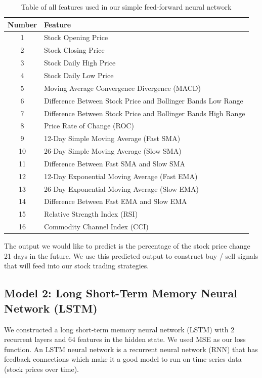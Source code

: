 \documentclass[10pt]{article}
\begin{document}
\begin{table}[H]
\centering
\begin{tabular}{| c | l |} 
\hline
Number & Feature \\
\hline
1 & Stock Opening Price \\
2 & Stock Closing Price \\
3 & Stock Daily High Price \\
4 & Stock Daily Low Price \\
5 & Moving Average Convergence Divergence (MACD) \\
6 & Difference Between Stock Price and Bollinger Bands Low Range \\
7 & Difference Between Stock Price and Bollinger Bands High Range  \\
8 & Price Rate of Change (ROC) \\
9 & 12-Day Simple Moving Average (Fast SMA) \\
10 & 26-Day Simple Moving Average (Slow SMA) \\
11 & Difference Between Fast SMA and Slow SMA \\
12 & 12-Day Exponential Moving Average (Fast EMA) \\
13 & 26-Day Exponential Moving Average (Slow EMA) \\
14 & Difference Between Fast EMA and Slow EMA \\
15 & Relative Strength Index (RSI) \\
16 & Commodity Channel Index (CCI) \\
\hline
\end{tabular}
\caption{Table of all features used in our simple feed-forward neural network}
\label{fffeatures}
\end{table}

The output we would like to predict is the percentage of the stock price change 21 days in the future. We use this predicted output to construct buy / sell signals that will feed into our stock trading strategies.



\subsection{Model 2: Long Short-Term Memory Neural Network (LSTM)}

We constructed a long short-term memory neural network (LSTM) with 2 recurrent layers and 64 features in the hidden state. We used MSE as our loss function. An LSTM neural network is a recurrent neural network (RNN) that has feedback connections which make it a good model to run on time-series data (stock prices over time).
\end{document}
